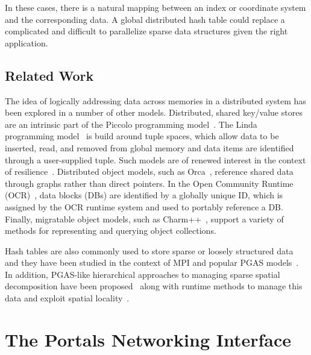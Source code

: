 In these cases, there is a natural mapping between an index or
coordinate system and the corresponding data. A global distributed
hash table could replace a complicated and difficult to parallelize
sparse data structures given the right application.

\subsection{Related Work}

The idea of logically addressing data across memories in a distributed system
has been explored in a number of other models.  Distributed, shared key/value
stores are an intrinsic part of the Piccolo programming model~\cite{power:10}.
The Linda programming model~\cite{ahuja:86} is build around tuple spaces, which
allow data to be inserted, read, and removed from global memory and data items
are identified through a user-supplied tuple.  Such models are of renewed
interest in the context of resilience~\cite{wilke:14}.  Distributed object
models, such as Orca~\cite{bal:92}, reference shared data through graphs rather
than direct pointers.  In the Open Community Runtime (OCR)~\cite{OCR}, data
blocks (DBs) are identified by a globally unique ID, which is assigned by the
OCR runtime system and used to portably reference a DB.  Finally, migratable
object models, such as Charm++~\cite{kale:93}, support a variety of methods for
representing and querying object collections.

Hash tables are also commonly used to store sparse or loosely structured data
and they have been studied in the context of MPI and popular PGAS
models~\cite{maynard:12}.  In addition, PGAS-like hierarchical approaches to
managing sparse spatial decomposition have been proposed~\cite{larkins:08}
along with runtime methods to manage this data and exploit spatial
locality~\cite{larkins:12}.

\section{The Portals Networking Interface}





